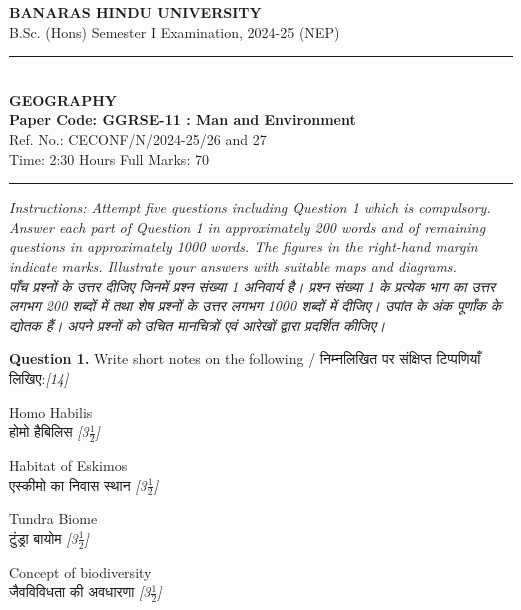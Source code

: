 \documentclass[11pt,a4paper]{article}
\newcommand{\pts}[1]{\hfill \textit{[#1]}}
\begin{document}
\begin{center}
  {\large\bfseries BANARAS HINDU UNIVERSITY}\\[2pt]
  {\normalsize B.Sc. (Hons) Semester I Examination, 2024-25 (NEP)}\\[6pt]
  \rule{0.8\linewidth}{0.5pt}\\[6pt]
  {\large\bfseries GEOGRAPHY}\\[4pt]
  {\large\bfseries Paper Code: GGRSE-11 : Man and Environment}\\[2pt]
  {\small Ref. No.: CECONF/N/2024-25/26 and 27}\\[4pt]
  {\normalsize Time: 2:30 Hours \hfill Full Marks: 70}
\end{center}

\rule{\linewidth}{0.4pt}

\smallskip

\noindent \textit{Instructions: Attempt five questions including Question 1 which is compulsory. Answer each part of Question 1 in approximately 200 words and of remaining questions in approximately 1000 words. The figures in the right-hand margin indicate marks. Illustrate your answers with suitable maps and diagrams.}\\[2pt]
\noindent \textit{पाँच प्रश्नों के उत्तर दीजिए जिनमें प्रश्न संख्या 1 अनिवार्य है। प्रश्न संख्या 1 के प्रत्येक भाग का उत्तर लगभग 200 शब्दों में तथा शेष प्रश्नों के उत्तर लगभग 1000 शब्दों में दीजिए। उपांत के अंक पूर्णांक के द्योतक हैं। अपने प्रश्नों को उचित मानचित्रों एवं आरेखों द्वारा प्रदर्शित कीजिए।}

\bigskip

\noindent \textbf{Question 1.} Write short notes on the following / निम्नलिखित पर संक्षिप्त टिप्पणियाँ लिखिए:\pts{14}

\begin{parts}
  \item Homo Habilis\\[1pt]
        होमो हैबिलिस \pts{3$\frac{1}{2}$}

  \item Habitat of Eskimos\\[1pt]
        एस्कीमो का निवास स्थान \pts{3$\frac{1}{2}$}

  \item Tundra Biome\\[1pt]
        टुंड्रा बायोम \pts{3$\frac{1}{2}$}

  \item Concept of biodiversity\\[1pt]
        जैवविविधता की अवधारणा \pts{3$\frac{1}{2}$}
\end{parts}
\end{document}
